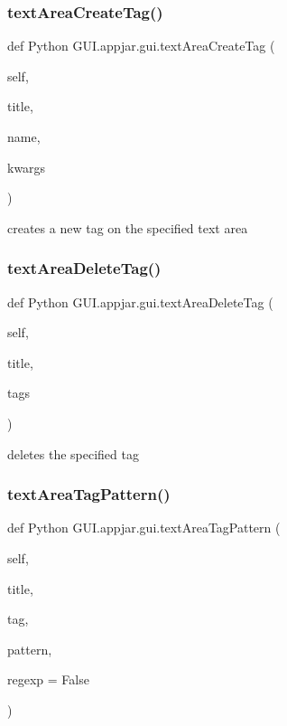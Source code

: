 \begin{DoxyVerb}
\subsubsection{\texorpdfstring{text\+Area\+Create\+Tag()}{textAreaCreateTag()}}
{\footnotesize\ttfamily def Python G\+U\+I.\+appjar.\+gui.\+text\+Area\+Create\+Tag (\begin{DoxyParamCaption}\item[{}]{self,  }\item[{}]{title,  }\item[{}]{name,  }\item[{}]{kwargs }\end{DoxyParamCaption})}

\begin{DoxyVerb}creates a new tag on the specified text area \end{DoxyVerb}
 \mbox{\label{class_python_01_g_u_i_1_1appjar_1_1gui_ae378601328627c5ae97b3863f4fab2f0}} 
\subsubsection{\texorpdfstring{text\+Area\+Delete\+Tag()}{textAreaDeleteTag()}}
{\footnotesize\ttfamily def Python G\+U\+I.\+appjar.\+gui.\+text\+Area\+Delete\+Tag (\begin{DoxyParamCaption}\item[{}]{self,  }\item[{}]{title,  }\item[{}]{tags }\end{DoxyParamCaption})}

\begin{DoxyVerb}deletes the specified tag \end{DoxyVerb}
 \mbox{\label{class_python_01_g_u_i_1_1appjar_1_1gui_a8689a0b557081aed3e01dfe9f8933d3c}} 
\subsubsection{\texorpdfstring{text\+Area\+Tag\+Pattern()}{textAreaTagPattern()}}
{\footnotesize\ttfamily def Python G\+U\+I.\+appjar.\+gui.\+text\+Area\+Tag\+Pattern (\begin{DoxyParamCaption}\item[{}]{self,  }\item[{}]{title,  }\item[{}]{tag,  }\item[{}]{pattern,  }\item[{}]{regexp = {\ttfamily False} }\end{DoxyParamCaption})}


\end{DoxyVerb}
